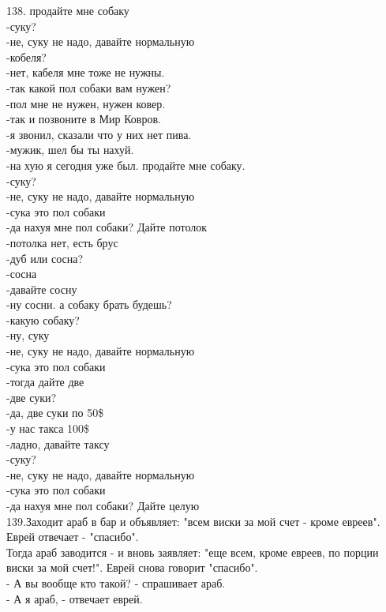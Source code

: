\documentclass[a4paper,20pt,notitlepage]{extbook}
\begin{document}
	138. продайте мне собаку\\
	-суку?\\
	-не, суку не надо, давайте нормальную\\
	-кобеля?\\
	-нет, кабеля мне тоже не нужны.\\
	-так какой пол собаки вам нужен?\\
	-пол мне не нужен, нужен ковер.\\
	-так и позвоните в Мир Ковров.\\
	-я звонил, сказали что у них нет пива.\\
	-мужик, шел бы ты нахуй.\\
	-на хую я сегодня уже был. продайте мне собаку.\\
	-суку?\\
	-не, суку не надо, давайте нормальную\\
	-сука это пол собаки\\
	-да нахуя мне пол собаки? Дайте потолок\\
	-потолка нет, есть брус\\
	-дуб или сосна?\\
	-сосна\\
	-давайте сосну\\
	-ну сосни. а собаку брать будешь?\\
	-какую собаку?\\
	-ну, суку\\
	-не, суку не надо, давайте нормальную\\
	-сука это пол собаки\\
	-тогда дайте две\\
	-две суки?\\
	-да, две суки по 50\$\\
	-у нас такса 100\$\\
	-ладно, давайте таксу\\
	-суку?\\
	-не, суку не надо, давайте нормальную\\
	-сука это пол собаки\\
	-да нахуя мне пол собаки? Дайте целую\\
	
	139.Заходит араб в бар и объявляет: "всем виски за мой счет - кроме евреев". \\Еврей отвечает - "спасибо".\\ Тогда араб заводится - и вновь заявляет: "еще всем, кроме евреев, по порции виски за мой счет!". Еврей снова говорит "спасибо".\\
	- А вы вообще кто такой? - спрашивает араб.\\
	- А я араб, - отвечает еврей.\\
	
\end{document}
